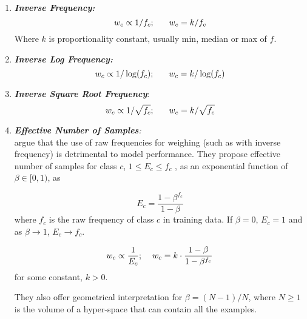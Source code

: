 \begin{enumerate}
\item \textit{\textbf{Inverse Frequency:}}
\begin{equation}
 w_c \propto 1/f_c;\hspace{6mm} w_c = k/f_c
\end{equation}
Where $k$ is proportionality constant, usually min, median or max of $f$.

\item \textit{\textbf{Inverse Log Frequency:}}
\begin{equation}
 w_c \propto 1/\log(f_c); \hspace{6mm} w_c = k/\log(f_c)
\end{equation}

\item \textit{\textbf{Inverse Square Root Frequency}}:
\begin{equation}
 w_c \propto 1/\sqrt{f_c};\hspace{6mm} w_c = k/\sqrt{f_c}
\end{equation}


\item \textit{\textbf{Effective Number of Samples}:}\\
\citet{cui2019effective-samples} argue that the use of raw frequencies for weighing (such as with inverse frequency) is detrimental to model performance. 
They propose effective number of samples for class $c$,  $1 \le E_c \le f_c $ , as an exponential function of $\beta \in [0,1)$, as

$$E_c = \frac{1-\beta^{f_c}}{1-\beta}$$ 
where $f_c$ is the raw frequency of class $c$ in training data.
If $\beta=0$, $E_c=1$ and as $\beta\rightarrow1$, $E_c \rightarrow f_c$.

\begin{equation}
    w_c \propto \frac{1}{E_c}; \hspace{4mm} w_c = k\cdot \frac{1-\beta}{1-\beta^{f_c}}
\end{equation}
for some constant, $k > 0$.

They also offer geometrical interpretation for $\beta=(N-1)/N$, where $N \ge 1$ is the volume of a hyper-space that can contain all the examples. 

\end{enumerate}




